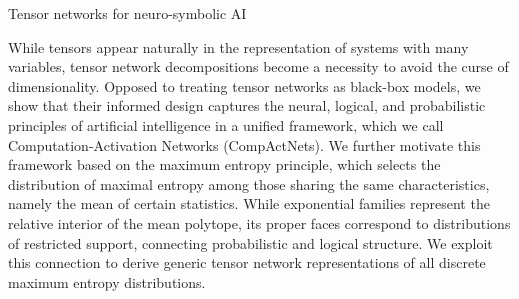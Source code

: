 Tensor networks for neuro-symbolic AI

While tensors appear naturally in the representation of systems with many variables, tensor network decompositions become a necessity to avoid the curse of dimensionality.
Opposed to treating tensor networks as black-box models, we show that their informed design captures the neural, logical, and probabilistic principles of artificial intelligence in a unified framework, which we call Computation-Activation Networks (CompActNets).
We further motivate this framework based on the maximum entropy principle, which selects the distribution of maximal entropy among those sharing the same characteristics, namely the mean of certain statistics.
While exponential families represent the relative interior of the mean polytope, its proper faces correspond to distributions of restricted support, connecting probabilistic and logical structure.
We exploit this connection to derive generic tensor network representations of all discrete maximum entropy distributions.